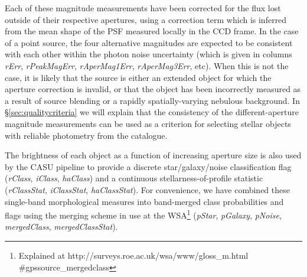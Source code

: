 \documentclass[useAMS,usenatbib]{mn2e}
\begin{document}
Each of these magnitude measurements have been
corrected for the flux lost outside of their respective apertures,
using a correction term which is inferred from the
mean shape of the PSF measured locally in the CCD frame.
In the case of a point source,
the four alternative magnitudes are expected
to be consistent with each other
within the photon noise uncertainty
(which is given in columns \emph{rErr}, \emph{rPeakMagErr},
\emph{rAperMag1Err}, \emph{rAperMag3Err}, etc).
When this is not the case,
it is likely that the source is either
an extended object for which the aperture correction is invalid,
or that the object has been incorrectly measured as a result of
source blending or a rapidly spatially-varying nebulous background.
In \S\ref{sec:qualitycriteria} we will explain that the consistency
of the different-aperture magnitude measurements
can be used as a criterion for selecting stellar objects
with reliable photometry from the catalogue.

The brightness of each object as a function of increasing
aperture size is also used by the CASU pipeline to provide
a discrete star/galaxy/noise classification flag
(\emph{rClass}, \emph{iClass}, \emph{haClass})
and a continuous stellarness-of-profile statistic
(\emph{rClassStat}, \emph{iClassStat}, \emph{haClassStat}).
For convenience, we have combined
these single-band morphological measures
into band-merged class probabilities and flags
using the merging scheme in use at the WSA\footnote{Explained at
http://surveys.roe.ac.uk/wsa/www/gloss\_m.html \#gpssource\_mergedclass
} (\emph{pStar}, \emph{pGalaxy}, \emph{pNoise},
\emph{mergedClass}, \emph{mergedClassStat}).
\end{document}
